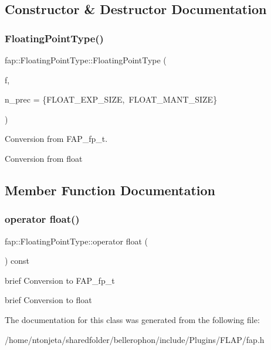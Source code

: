 \subsection{Constructor \& Destructor Documentation}
\hypertarget{classfap_1_1FloatingPointType_aa89105fd5d48eb7165b2234f852c7a19}{}\label{classfap_1_1FloatingPointType_aa89105fd5d48eb7165b2234f852c7a19} 
\subsubsection{\texorpdfstring{Floating\+Point\+Type()}{FloatingPointType()}}
{\footnotesize\ttfamily fap\+::\+Floating\+Point\+Type\+::\+Floating\+Point\+Type (\begin{DoxyParamCaption}\item[{float}]{f,  }\item[{\hyperlink{structfap_1_1FloatPrecTy}{Float\+Prec\+Ty}}]{n\+\_\+prec = {\ttfamily \{FLOAT\+\_\+EXP\+\_\+SIZE,~FLOAT\+\_\+MANT\+\_\+SIZE\}} }\end{DoxyParamCaption})\hspace{0.3cm}{\ttfamily [inline]}}



Conversion from F\+A\+P\+\_\+fp\+\_\+t. 

Conversion from float 

\subsection{Member Function Documentation}
\hypertarget{classfap_1_1FloatingPointType_af4d0ebec7d0f2cff3e901a5a74a04d26}{}\label{classfap_1_1FloatingPointType_af4d0ebec7d0f2cff3e901a5a74a04d26} 
\subsubsection{\texorpdfstring{operator float()}{operator float()}}
{\footnotesize\ttfamily fap\+::\+Floating\+Point\+Type\+::operator float (\begin{DoxyParamCaption}{ }\end{DoxyParamCaption}) const\hspace{0.3cm}{\ttfamily [explicit]}}



brief Conversion to F\+A\+P\+\_\+fp\+\_\+t 

brief Conversion to float 

The documentation for this class was generated from the following file\+:\begin{DoxyCompactItemize}
\item 
/home/ntonjeta/sharedfolder/bellerophon/include/\+Plugins/\+F\+L\+A\+P/fap.\+h\end{DoxyCompactItemize}
